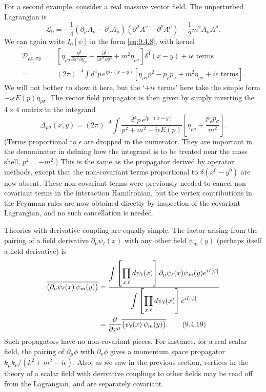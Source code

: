 For a second example, consider a real massive vector field. The unperturbed
Lagrangian is
\[
\mathcal L_0=-\frac14(\partial_\mu A_\nu-\partial_\nu A_\mu)
 (\partial^\mu A^\nu-\partial^\nu A^\mu)-\frac12m^2A_\mu A^\mu.
\]
We can again write $I_0[\psi]$ in the form \eqref{eq:9.4.8}, with kernel
\begin{align*}
\mathcal D_{\rho x,\sigma y}
={}&\left[\eta_{\rho\sigma}
 \frac{\partial^2}{\partial x^\mu\partial y_\mu}
 -\frac{\partial^2}{\partial x^\sigma\partial y^\rho}
 +m^2\eta_{\rho\sigma}\right]\delta^4(x-y)+i\epsilon\text{ terms}
\\
={}&(2\pi)^{-4}\int d^4p\,e^{ip\cdot(x-y)}
 \left[\eta_{\rho\sigma}p^2-p_\rho p_\sigma
 +m^2\eta_{\rho\sigma}+i\epsilon\text{ terms}\right].
\end{align*}
We will not bother to show it here, but the `$+i\epsilon$ terms' here take the
simple form $-i\epsilon E(p)\eta_{\rho\sigma}$. The vector field propagator is
then given by simply inverting the $4\times4$ matrix in the integrand
\[
\Delta_{\rho\sigma}(x,y)=(2\pi)^{-4}\int
 \frac{d^4p\,e^{ip\cdot(x-y)}}{p^2+m^2-i\epsilon E(p)}
 \left[\eta_{\rho\sigma}+\frac{p_\rho p_\sigma}{m^2}\right].
\]
(Terms proportional to $\epsilon$ are dropped in the numerator. They are
important in the denominator in defining how the integrand is to be treated
near the mass shell, $p^2=-m^2$.) This is the same as the propagator derived by
operator methods, except that the non-covariant terms proportional to
$\delta(x^0-y^0)$ are now absent. These non-covariant terms were previously
needed to cancel non-covariant terms in the interaction Hamiltonian, but the
vertex contributions in the Feynman rules are now obtained directly by
inspection of the covariant Lagrangian, and no such cancellation is needed.

Theories with derivative coupling are equally simple. The factor arising from
the pairing of a field derivative $\partial_\mu\psi_\ell(x)$ with any other
field $\psi_m(y)$ (perhaps itself a field derivative) is
\begin{align}
\overline{\bigl(\partial_\mu\psi_\ell(x)\,\psi_m(y)\bigr)}
&=\frac{\displaystyle\int\left[\prod_{x,\ell}d\psi_\ell(x)\right]
 \partial_\mu\psi_\ell(x)\psi_m(y)e^{iI[\psi]}}
 {\displaystyle\int\left[\prod_{x,\ell}d\psi_\ell(x)\right]e^{iI[\psi]}}
\notag\\
&=\frac{\partial}{\partial x^\mu}
 \overline{\bigl(\psi_\ell(x)\,\psi_m(y)\bigr)}.
\tag{9.4.19}\label{eq:9.4.19}
\end{align}
Such propagators have no non-covariant pieces. For instance, for a real scalar
field, the pairing of $\partial_\mu\phi$ with $\partial_\nu\phi$ gives a
momentum space propagator $k_\mu k_\nu/(k^2+m^2-i\epsilon)$. Also, as we saw in
the previous section, vertices in the theory of a scalar field with derivative
couplings to other fields may be read off from the Lagrangian, and are
separately covariant.
